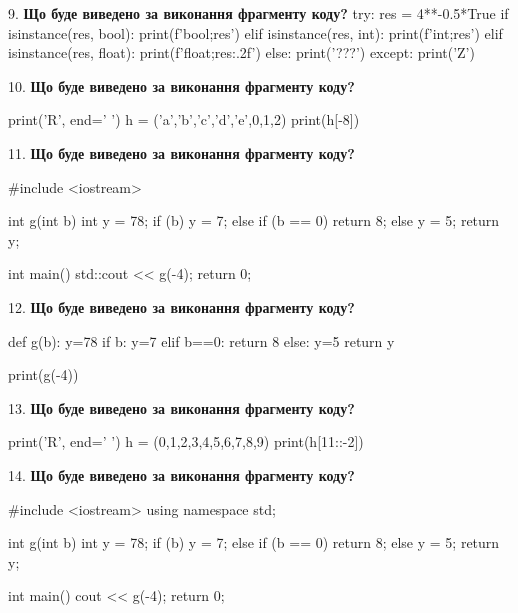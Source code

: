 \documentclass[11pt]{article}
\begin{document}
\par\vspace{5mm}
9. \textbf{Що буде виведено за виконання фрагменту коду?}
try:
    res = 4**-0.5*True
    if isinstance(res, bool):
        print(f'bool;{res}')
    elif isinstance(res, int):
        print(f'int;{res}')
    elif isinstance(res, float):
        print(f'float;{res:.2f}')
    else:
        print('???')
except:
    print('Z')
\par\vspace{5mm}
10. \textbf{Що буде виведено за виконання фрагменту коду?}

print('R', end=' ')
h = ('a','b','c','d','e',0,1,2)
print(h[-8])

\par\vspace{5mm}
11. \textbf{Що буде виведено за виконання фрагменту коду?}

#include <iostream>

int g(int b){
    int y = 78;
    if (b) 
        y = 7;
    else if (b == 0)
         return 8;
    else
         y = 5;
    return y;
}

int main(){
    std::cout << g(-4);
    return 0;
}

\par\vspace{5mm}
12. \textbf{Що буде виведено за виконання фрагменту коду?}

def g(b):
    y=78
    if b: 
        y=7
    elif b==0:
         return 8
    else:
         y=5
    return y

print(g(-4))
\par\vspace{5mm}
13. \textbf{Що буде виведено за виконання фрагменту коду?}

print('R', end=' ')
h = (0,1,2,3,4,5,6,7,8,9)
print(h[11::-2])

\par\vspace{5mm}
14. \textbf{Що буде виведено за виконання фрагменту коду?}

#include <iostream>
using namespace std;

int g(int b){
    int y = 78;
    if (b) 
        y = 7;
    else if (b == 0)
         return 8;
    else
         y = 5;
    return y;
}

int main(){
    cout << g(-4);
    return 0;
}
\end{document}
